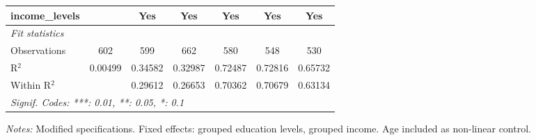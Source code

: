 \begin{tabular}{lcccccc}
   income\_levels                            &          & Yes           & Yes          & Yes      & Yes      & Yes\\  
   \midrule
   \emph{Fit statistics}\\
   Observations                              & 602      & 599           & 662          & 580      & 548      & 530\\  
   R$^2$                                     & 0.00499  & 0.34582       & 0.32987      & 0.72487  & 0.72816  & 0.65732\\  
   Within R$^2$                              &          & 0.29612       & 0.26653      & 0.70362  & 0.70679  & 0.63134\\  
   \midrule \midrule
   \multicolumn{7}{l}{\emph{Signif. Codes: ***: 0.01, **: 0.05, *: 0.1}}\\
\end{tabular}
 
\par \raggedright 
\textit{Notes:} Modified specifications. Fixed effects: grouped education levels, grouped income. Age included as non-linear control.
\par\endgroup


